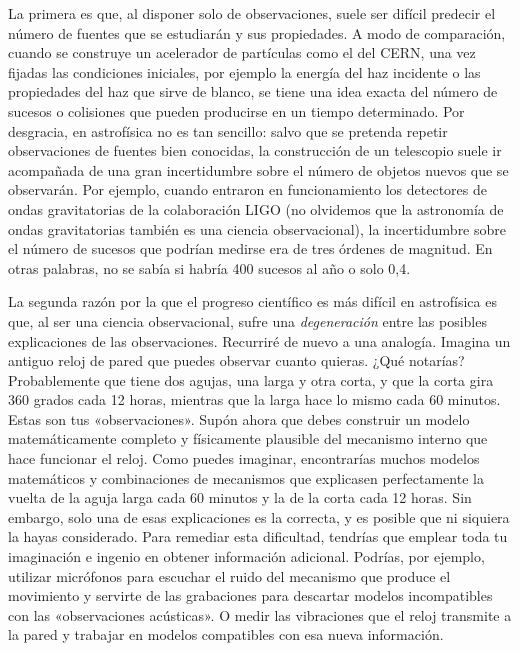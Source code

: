 La primera es que, al disponer solo de observaciones, suele ser difícil predecir el número de fuentes que se estudiarán y sus propiedades. A modo de comparación, cuando se construye un acelerador de partículas como el del CERN, una vez fijadas las condiciones iniciales, por ejemplo la energía del haz incidente o las propiedades del haz que sirve de blanco, se tiene una idea exacta del número de sucesos o colisiones que pueden producirse en un tiempo determinado. Por desgracia, en astrofísica no es tan sencillo: salvo que se pretenda repetir observaciones de fuentes bien conocidas, la construcción de un telescopio suele ir acompañada de una gran incertidumbre sobre el número de objetos nuevos que se observarán. Por ejemplo, cuando entraron en funcionamiento los detectores de ondas gravitatorias de la colaboración LIGO (no olvidemos que la astronomía de ondas gravitatorias también es una ciencia observacional), la incertidumbre sobre el número de sucesos que podrían medirse era de tres órdenes de magnitud. En otras palabras, no se sabía si habría 400 sucesos al año o solo 0,4.

La segunda razón por la que el progreso científico es más difícil en astrofísica es que, al ser una ciencia observacional, sufre una \emph{degeneración} entre las posibles explicaciones de las observaciones. Recurriré de nuevo a una analogía. Imagina un antiguo reloj de pared que puedes observar cuanto quieras. ¿Qué notarías? Probablemente que tiene dos agujas, una larga y otra corta, y que la corta gira 360 grados cada 12 horas, mientras que la larga hace lo mismo cada 60 minutos. Estas son tus «observaciones». Supón ahora que debes construir un modelo matemáticamente completo y físicamente plausible del mecanismo interno que hace funcionar el reloj. Como puedes imaginar, encontrarías muchos modelos matemáticos y combinaciones de mecanismos que explicasen perfectamente la vuelta de la aguja larga cada 60 minutos y la de la corta cada 12 horas. Sin embargo, solo una de esas explicaciones es la correcta, y es posible que ni siquiera la hayas considerado. Para remediar esta dificultad, tendrías que emplear toda tu imaginación e ingenio en obtener información adicional. Podrías, por ejemplo, utilizar micrófonos para escuchar el ruido del mecanismo que produce el movimiento y servirte de las grabaciones para descartar modelos incompatibles con las «observaciones acústicas». O medir las vibraciones que el reloj transmite a la pared y trabajar en modelos compatibles con esa nueva información.

